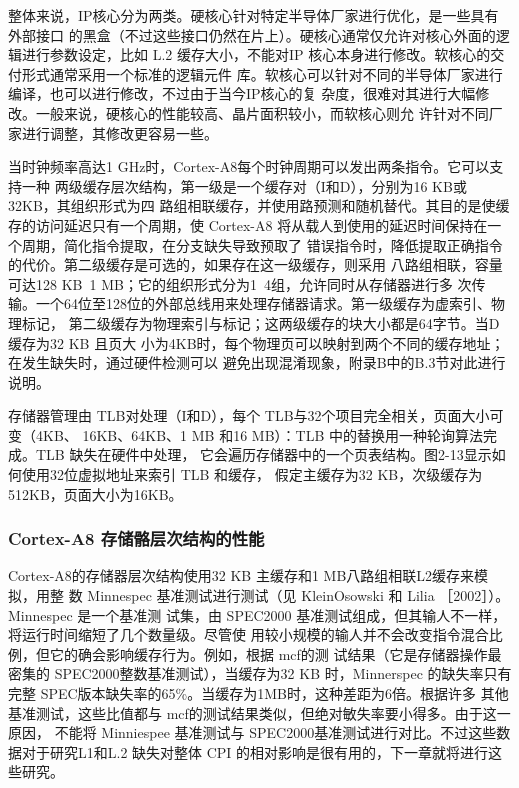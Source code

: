 整体来说，IP核心分为两类。硬核心针对特定半导体厂家进行优化，是一些具有外部接口
的黑盒（不过这些接口仍然在片上）。硬核心通常仅允许对核心外面的逻辑进行参数设定，比如
L.2 缓存大小，不能对IP 核心本身进行修改。软核心的交付形式通常采用一个标准的逻辑元件
库。软核心可以针对不同的半导体厂家进行编译，也可以进行修改，不过由于当今IP核心的复
杂度，很难对其进行大幅修改。一般来说，硬核心的性能较高、晶片面积较小，而软核心则允
许针对不同厂家进行调整，其修改更容易一些。

当时钟频率高达1 GHz时，Cortex-A8每个时钟周期可以发出两条指令。它可以支持一种
两级缓存层次结构，第一级是一个缓存对（I和D），分别为16 KB或32KB，其组织形式为四
路组相联缓存，并使用路预测和随机替代。其目的是使缓存的访问延迟只有一个周期，使
Cortex-A8 将从载人到使用的延迟时间保持在一个周期，简化指令提取，在分支缺失导致预取了
错误指令时，降低提取正确指令的代价。第二级缓存是可选的，如果存在这一级缓存，则采用
八路组相联，容量可达128 KB~1 MB；它的组织形式分为1~4组，允许同时从存储器进行多
次传输。一个64位至128位的外部总线用来处理存储器请求。第一级缓存为虚索引、物理标记，
第二级缓存为物理索引与标记；这两级缓存的块大小都是64字节。当D缓存为32 KB 且页大
小为4KB时，每个物理页可以映射到两个不同的缓存地址；在发生缺失时，通过硬件检测可以
避免出现混淆现象，附录B中的B.3节对此进行说明。

存储器管理由 TLB对处理（I和D），每个 TLB与32个项目完全相关，页面大小可变（4KB、
16KB、64KB、1 MB 和16 MB）：TLB 中的替换用一种轮询算法完成。TLB 缺失在硬件中处理，
它会遍历存储器中的一个页表结构。图2-13显示如何使用32位虚拟地址来索引 TLB 和缓存，
假定主缓存为32 KB，次级缓存为512KB，页面大小为16KB。

\subsubsection{Cortex-A8 存储骼层次结构的性能}

Cortex-A8的存储器层次结构使用32 KB 主缓存和1 MB八路组相联L2缓存来模拟，用整
数 Minnespec 基准测试进行测试（见 KleinOsowski 和 Lilia ［2002］）。Minnespec 是一个基准测
试集，由 SPEC2000 基准测试组成，但其输人不一样，将运行时间缩短了几个数量级。尽管使
用较小规模的输人并不会改变指令混合比例，但它的确会影响缓存行为。例如，根据 mcf的测
试结果（它是存储器操作最密集的 SPEC2000整数基准测试），当缓存为32 KB 时，Minnerspec
的缺失率只有完整 SPEC版本缺失率的65\%。当缓存为1MB时，这种差距为6倍。根据许多
其他基准测试，这些比值都与 mcf的测试结果类似，但绝对敏失率要小得多。由于这一原因，
不能将 Minniespee 基准测试与 SPEC2000基准测试进行对比。不过这些数据对于研究L1和L.2
缺失对整体 CPI 的相对影响是很有用的，下一章就将进行这些研究。

